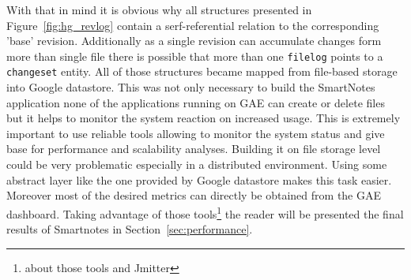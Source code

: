 With that in mind it is obvious why all structures presented in Figure~\ref{fig:hg_revlog} contain a serf-referential relation to the corresponding 'base' revision. Additionally as a single revision can accumulate changes form more than single file there is possible that more than one \texttt{filelog} points to a \texttt{changeset} entity. All of those structures became mapped from file-based storage into Google datastore. This was not only necessary to build the SmartNotes application none of the applications running on GAE can create or delete files but it helps to monitor the system reaction on increased usage. This is extremely important to use reliable tools allowing to monitor the system status and give base for performance and scalability analyses. Building it on file storage level could be very problematic especially in a distributed environment. Using some abstract layer like the one provided by Google datastore makes this task easier. Moreover most of the desired metrics can directly be obtained from the GAE dashboard. Taking advantage of those tools\footnote{about those tools and Jmitter} the reader will be presented  the final results of Smartnotes in Section~\ref{sec:performance}.

